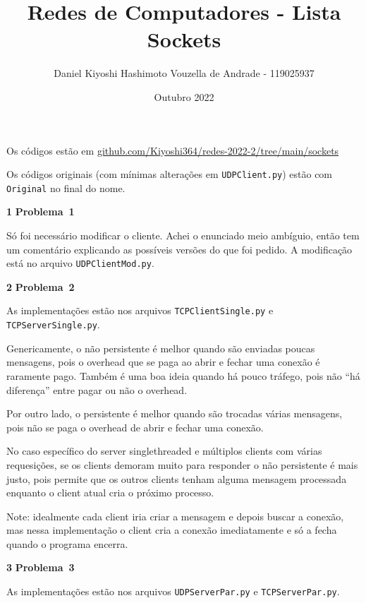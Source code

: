 \documentclass{article}
\title{Redes de Computadores - Lista Sockets}
\author{Daniel Kiyoshi Hashimoto Vouzella de Andrade - 119025937}
\date{Outubro 2022}
\newcounter{exe-list}
\newenvironment{exe}[2][Problema]
    {\newcommand{\opt}{(Opcional)}%
    \newcommand{\sketch}[1]{{\bfseries Rascunho:} ##1}%
    \medskip\par\noindent\ifthenelse{\equal{#1}{}}
        {\textbf{\large #2}}
        {\textbf{\large #1~#2}}%
    \medskip\par\noindent}
    {\medskip}
\begin{document}
\maketitle

Os códigos estão em
\href{https://github.com/Kiyoshi364/redes-2022-2/tree/main/sockets}
{github.com/Kiyoshi364/redes-2022-2/tree/main/sockets}

Os códigos originais (com mínimas alterações em \texttt{UDPClient.py})
estão com \texttt{Original} no final do nome.
\bigskip

\begin{exe}{1}
    Só foi necessário modificar o cliente.
    Achei o enunciado meio ambíguio,
    então tem um comentário explicando as possíveis
    versões do que foi pedido.
    A modificação está no arquivo \texttt{UDPClientMod.py}.
\end{exe}

\begin{exe}{2}
    As implementações estão nos arquivos
    \texttt{TCPClientSingle.py} e \texttt{TCPServerSingle.py}.

    Genericamente, o não persistente é melhor quando
    são enviadas poucas mensagens,
    pois o overhead que se paga ao abrir e fechar uma conexão
    é raramente pago.
    Também é uma boa ideia quando há pouco tráfego,
    pois não ``há diferença'' entre pagar ou não o overhead.

    Por outro lado, o persistente é melhor quando
    são trocadas várias mensagens,
    pois não se paga o overhead de abrir e fechar uma conexão.

    No caso específico do server singlethreaded e
    múltiplos clients com várias requesições,
    se os clients demoram muito para responder
    o não persistente é mais justo,
    pois permite que os outros clients tenham alguma
    mensagem processada enquanto o client atual cria
    o próximo processo.

    Note: idealmente cada client iria criar a mensagem e
    depois buscar a conexão,
    mas nessa implementação o client cria a conexão imediatamente
    e só a fecha quando o programa encerra.
\end{exe}

\begin{exe}{3}
    As implementações estão nos arquivos
    \texttt{UDPServerPar.py} e \texttt{TCPServerPar.py}.
\end{exe}
\end{document}
